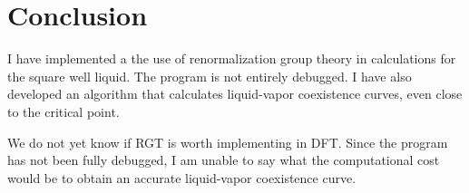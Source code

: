 \documentclass[letterpaper,twocolumn,amsmath,amssymb,prb]{revtex4-1}
\begin{document}
\section{Conclusion}\label{sec:conclusion}

I have implemented a the use of renormalization group theory in
calculations for the square well liquid. The program is not entirely
debugged. I have also developed an algorithm that calculates
liquid-vapor coexistence curves, even close to the critical point.

We do not yet know if RGT is worth implementing in DFT. Since the program has
not been fully debugged, I am unable to say what the computational
cost would be to obtain an accurate liquid-vapor coexistence curve.


\end{document}
